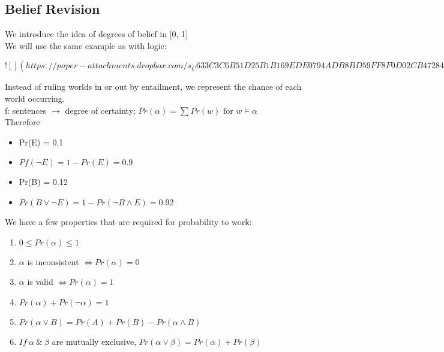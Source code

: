 \documentclass[../../lecture_notes.tex]{subfiles}
\begin{document}
\subsection*{Belief Revision}
\noindent We introduce the idea of degrees of belief in [0, 1]\\
We will use the same example as with logic:

\newpage
$![](https://paper-attachments.dropbox.com/s_C633C3C6B51D25B1B169EDE0794ADB8BD59FF8F0D02CB47284480A604E1852A9_1589858360590_Untitled+drawing+2.jpg)$
\newpage

\noindent Instead of ruling worlds in or out by entailment, we represent the chance of each world occurring.\\
\indent f: sentences $\rightarrow$ degree of certainty; $Pr(\alpha) = \sum Pr(w) \text{ for } w \models \alpha$\\
Therefore \begin{itemize} [itemsep=0mm]
	\item Pr(E) = 0.1
	\item $Pf(\neg E) = 1 - Pr(E) = 0.9$
	\item Pr(B) = 0.12
	\item $Pr(B \lor \neg E) = 1 - Pr(\neg B \land E) = 0.92$
\end{itemize}

\noindent We have a few properties that are required for probability to work:
	\begin{enumerate} [itemsep=0mm]
		\item $0 \leq Pr(\alpha) \leq 1$
		\item $\alpha$ is inconsistent $\iff Pr(\alpha) = 0$
		\item $\alpha$ is valid $\iff Pr(\alpha) = 1$
		\item $Pr(\alpha) + Pr(\neg\alpha) = 1$
		\item $Pr(\alpha\lor B) = Pr(A) + Pr(B) - Pr(\alpha \land B)$
		\item $If \ \alpha\ \&\ \beta$ are mutually exclusive, $Pr(\alpha\lor\beta) = Pr(\alpha) + Pr(\beta)$
	\end{enumerate}
\end{document}
